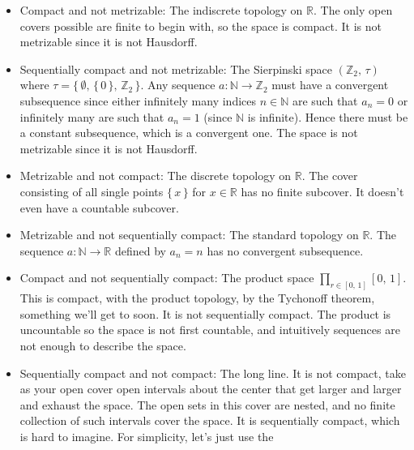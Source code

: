 \documentclass{article}
\theoremstyle{plain}
\theoremstyle{normal}
\begin{document}
        \begin{itemize}
            \item Compact and not metrizable: The indiscrete topology on
                $\mathbb{R}$. The only open covers possible are finite to begin
                with, so the space is compact. It is not metrizable since it
                is not Hausdorff.
            \item Sequentially compact and not metrizable: The
                Sierpinski space $(\mathbb{Z}_{2},\,\tau)$ where
                $\tau=\big\{\,\emptyset,\,\{\,0\,\},\,\mathbb{Z}_{2}\,\big\}$.
                Any sequence $a:\mathbb{N}\rightarrow\mathbb{Z}_{2}$ must have
                a convergent subsequence since either infinitely many indices
                $n\in\mathbb{N}$ are such that $a_{n}=0$ or infinitely many are
                such that $a_{n}=1$ (since $\mathbb{N}$ is infinite). Hence
                there must be a constant subsequence, which is a convergent
                one. The space is not metrizable since it is not Hausdorff.
            \item Metrizable and not compact: The discrete topology on
                $\mathbb{R}$. The cover consisting of all single points
                $\{\,x\,\}$ for $x\in\mathbb{R}$ has no finite subcover. It
                doesn't even have a countable subcover.
            \item Metrizable and not sequentially compact: The standard topology
                on $\mathbb{R}$. The sequence
                $a:\mathbb{N}\rightarrow\mathbb{R}$ defined by $a_{n}=n$ has no
                convergent subsequence.
            \item Compact and not sequentially compact: The product space
                $\prod_{r\in[0,\,1]}[0,\,1]$. This is compact, with the product
                topology, by the Tychonoff theorem, something we'll get to
                soon. It is not sequentially compact. The product is
                uncountable so the space is not first countable, and intuitively
                sequences are not enough to describe the space.
            \item Sequentially compact and not compact: The long line. It is not
                compact, take as your open cover open intervals about the
                center that get larger and larger and exhaust the space. The
                open sets in this cover are nested, and no finite collection of
                such intervals cover the space. It is sequentially compact,
                which is hard to imagine. For simplicity, let's just use the

\end{itemize}
\end{document}
